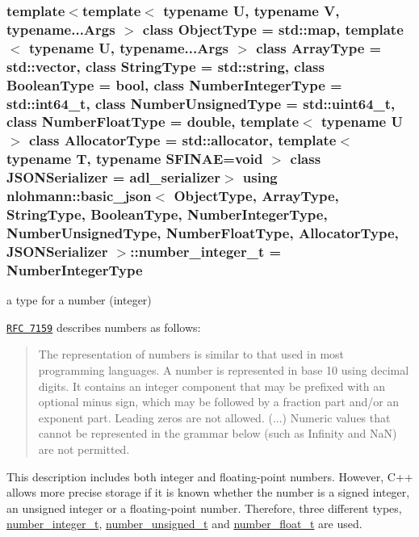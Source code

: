 \subsubsection[{\texorpdfstring{number\+\_\+integer\+\_\+t}{number_integer_t}}]{\setlength{\rightskip}{0pt plus 5cm}template$<$template$<$ typename U, typename V, typename...\+Args $>$ class Object\+Type = std\+::map, template$<$ typename U, typename...\+Args $>$ class Array\+Type = std\+::vector, class String\+Type  = std\+::string, class Boolean\+Type  = bool, class Number\+Integer\+Type  = std\+::int64\+\_\+t, class Number\+Unsigned\+Type  = std\+::uint64\+\_\+t, class Number\+Float\+Type  = double, template$<$ typename U $>$ class Allocator\+Type = std\+::allocator, template$<$ typename T, typename S\+F\+I\+N\+A\+E=void $>$ class J\+S\+O\+N\+Serializer = adl\+\_\+serializer$>$ using {\bf nlohmann\+::basic\+\_\+json}$<$ Object\+Type, Array\+Type, String\+Type, Boolean\+Type, Number\+Integer\+Type, Number\+Unsigned\+Type, Number\+Float\+Type, Allocator\+Type, J\+S\+O\+N\+Serializer $>$\+::{\bf number\+\_\+integer\+\_\+t} =  Number\+Integer\+Type}\hypertarget{classnlohmann_1_1basic__json_a98e611d67b7bd75307de99c9358ab2dc}{}\label{classnlohmann_1_1basic__json_a98e611d67b7bd75307de99c9358ab2dc}


a type for a number (integer) 

\href{http://rfc7159.net/rfc7159}{\tt R\+FC 7159} describes numbers as follows\+: \begin{quote}
The representation of numbers is similar to that used in most programming languages. A number is represented in base 10 using decimal digits. It contains an integer component that may be prefixed with an optional minus sign, which may be followed by a fraction part and/or an exponent part. Leading zeros are not allowed. (...) Numeric values that cannot be represented in the grammar below (such as Infinity and NaN) are not permitted. \end{quote}


This description includes both integer and floating-\/point numbers. However, C++ allows more precise storage if it is known whether the number is a signed integer, an unsigned integer or a floating-\/point number. Therefore, three different types, \hyperlink{classnlohmann_1_1basic__json_a98e611d67b7bd75307de99c9358ab2dc}{number\+\_\+integer\+\_\+t}, \hyperlink{classnlohmann_1_1basic__json_ab906e29b5d83ac162e823ada2156b989}{number\+\_\+unsigned\+\_\+t} and \hyperlink{classnlohmann_1_1basic__json_a88d6103cb3620410b35200ee8e313d97}{number\+\_\+float\+\_\+t} are used.

